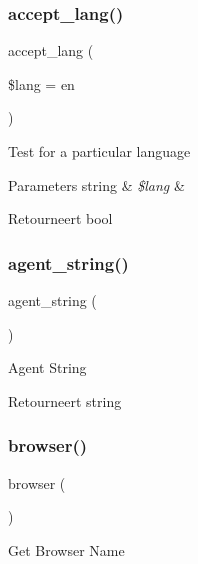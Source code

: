 \subsubsection{\texorpdfstring{accept\_lang()}{accept\_lang()}}
{\footnotesize\ttfamily accept\+\_\+lang (\begin{DoxyParamCaption}\item[{}]{\$lang = {\ttfamily \textquotesingle{}en\textquotesingle{}} }\end{DoxyParamCaption})}

Test for a particular language


\begin{DoxyParams}[1]{Parameters}
string & {\em \$lang} & \\
\hline
\end{DoxyParams}
\begin{DoxyReturn}{Retourneert}
bool 
\end{DoxyReturn}
\mbox{\label{class_c_i___user__agent_a2a75d1ec3cf3f59cdcae64f6afbc8a1b}} 
\subsubsection{\texorpdfstring{agent\_string()}{agent\_string()}}
{\footnotesize\ttfamily agent\+\_\+string (\begin{DoxyParamCaption}{ }\end{DoxyParamCaption})}

Agent String

\begin{DoxyReturn}{Retourneert}
string 
\end{DoxyReturn}
\mbox{\label{class_c_i___user__agent_a7dbfb19bfe0682921dcfad5de8dc987c}} 
\subsubsection{\texorpdfstring{browser()}{browser()}}
{\footnotesize\ttfamily browser (\begin{DoxyParamCaption}{ }\end{DoxyParamCaption})}

Get Browser Name

